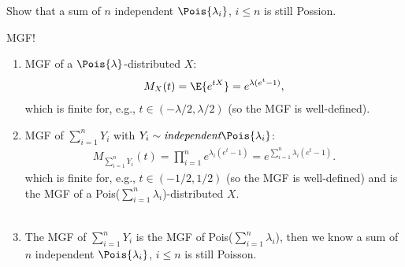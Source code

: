 \begin{exercise} 
	Show that a  sum of $n$ independent $\Pois{\lambda_i}$, $i\leq n$ is still Possion.
	\begin{hint} 
		MGF!
	\end{hint}
	\begin{solution}
		\begin{enumerate}
				\item {MGF of a $\Pois{\lambda}$-distributed $X$}: $$M_X(t)=\E{e^{tX}} =e^{\lambda (e^t-1)},$$ {which is finite for, e.g., $t\in (-\lambda/2, \lambda/2)$ (so the MGF is well-defined)}.
			\item {MGF of $\sum_{i=1}^{n} Y_i$} with $Y_i\sim \textit{independent} \Pois{\lambda_i}$: 
			\begin{align*}
				M_{\sum_{i=1}^{n}Y_i}(t) =\prod_{i=1}^{n} e^{\lambda_i (e^t-1) }=e^{\sum_{i=1}^{n} \lambda_i (e^t-1) }.
			\end{align*}
			{which is finite for, e.g., $t\in (-1/2, 1/2)$ (so the MGF is well-defined) and is the MGF of a Pois($\sum_{i=1}^{n} \lambda_i$)-distributed $X$.} \\~\\
			\item The MGF of   $\sum_{i=1}^{n} Y_i$ is  the MGF of Pois($\sum_{i=1}^{n} \lambda_i$), then we know a  sum of $n$ independent $\Pois{\lambda_i}$, $i\leq n$ is still Poisson.
		\end{enumerate}
	\end{solution}
\end{exercise}

